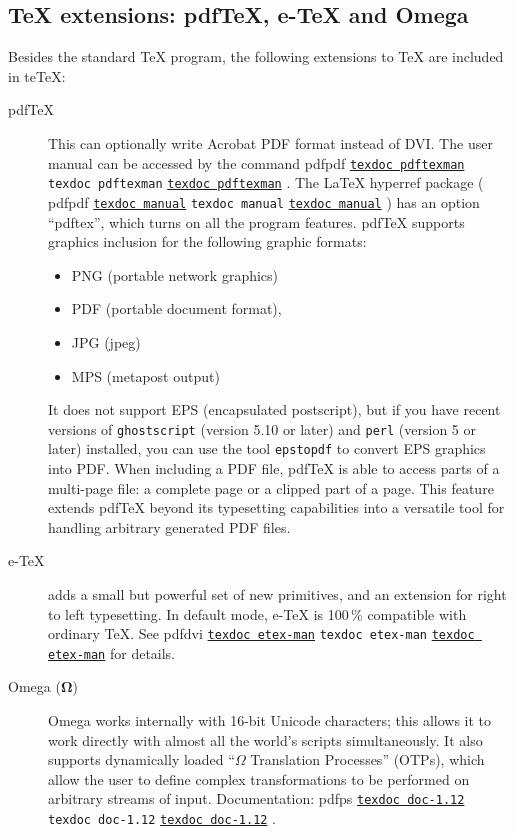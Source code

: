 \documentclass[11pt,a4paper]{article}
\newcommand{\pdfext}{pdf}
\newcommand{\dviext}{dvi}
\let\docext=\pdfext
\let\docext=\dviext
\newcommand{\dlink}[3]{%
  \ifpdf
    \ifx\pdfext#3
      \href{#1/#2.#3}{\texttt{texdoc #2}}%
    \else
      \texttt{texdoc #2}%
    \fi
  \else
     \href{#1/#2.#3}{\mbox{\texttt{texdoc #2}}}%
  \fi}
\newcommand{\teTeX}{\textrm{te}\TeX\xspace}
\begin{document}
\subsection{\TeX{} extensions: pdf\TeX, e-\TeX{} and Omega}
Besides the standard \TeX{} program, the
  following extensions to \TeX{} are included in \teTeX:
\begin{description}
\item [pdf\TeX] This can optionally write Acrobat PDF format instead
  of DVI. The user manual can be accessed by the command
  \dlink{../pdftex/base}{pdftexman}{\pdfext}. The \LaTeX{} hyperref
  package (\dlink{../latex/hyperref}{manual}{\pdfext}) has an option
  ``pdftex'', which turns on all the program features. pdf\TeX{}
  supports graphics inclusion for the following graphic formats:
  \begin{itemize}
  \item PNG (portable network graphics)
  \item PDF (portable document format),
  \item JPG (jpeg)
  \item MPS (metapost output)
  \end{itemize}
  It does not support EPS (encapsulated postscript), but if you have
  recent versions of \texttt{ghostscript} (version 5.10 or later) and
  \texttt{perl} (version 5 or later) installed, you can use the tool
  \texttt{epstopdf} to convert EPS graphics into PDF. When including a
  PDF file, pdf\TeX{} is able to access parts of a multi-page file: a
  complete page or a clipped part of a page. This feature extends
  pdf\TeX{} beyond its typesetting capabilities into a versatile tool
  for handling arbitrary generated PDF files.

\item [e-\TeX] adds a small but powerful set of new primitives, and an
  extension for right to left typesetting. In default mode, e-\TeX{}
  is 100\,\% compatible with ordinary \TeX.  See
  \dlink{../etex/base}{etex-man}{\docext} for details.
\item [Omega ($\bm \Omega$)] Omega works internally with 16-bit
  Unicode characters; this allows it to work directly with
  almost all the world's scripts simultaneously. It also supports
  dynamically loaded ``$\Omega$ Translation Processes'' (OTPs), which
  allow the user to define complex transformations to be performed on
  arbitrary streams of input. Documentation:
  \dlink{../omega/base}{doc-1.12}{ps}.
\end{description}
\end{document}
